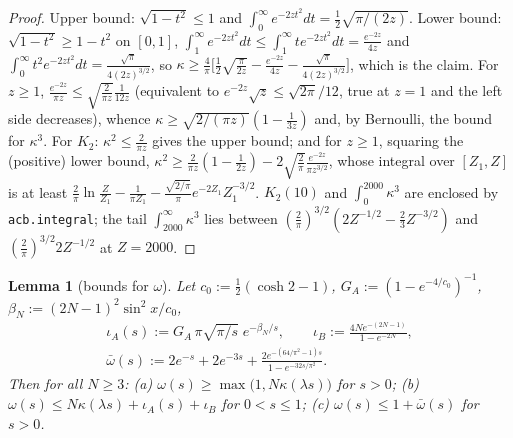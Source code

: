 \documentclass[11pt,a4paper]{article}
\newtheorem{lemma}[theorem]{Lemma}
\theoremstyle{definition}
\theoremstyle{remark}
\begin{document}
\begin{proof}
Upper bound: $\sqrt{1-t^2}\le1$ and $\int_0^\infty e^{-2zt^2}dt=\frac12\sqrt{\pi/(2z)}$. Lower bound: $\sqrt{1-t^2}\ge1-t^2$ on $[0,1]$, $\int_1^\infty e^{-2zt^2}dt\le\int_1^\infty te^{-2zt^2}dt=\frac{e^{-2z}}{4z}$ and $\int_0^\infty t^2e^{-2zt^2}dt=\frac{\sqrt\pi}{4(2z)^{3/2}}$, so $\kappa\ge\frac4\pi\bigl[\frac12\sqrt{\frac{\pi}{2z}}-\frac{e^{-2z}}{4z}-\frac{\sqrt\pi}{4(2z)^{3/2}}\bigr]$, which is the claim. For $z\ge1$, $\frac{e^{-2z}}{\pi z}\le\sqrt{\frac2{\pi z}}\frac1{12z}$ (equivalent to $e^{-2z}\sqrt z\le\sqrt{2\pi}/12$, true at $z=1$ and the left side decreases), whence $\kappa\ge\sqrt{2/(\pi z)}(1-\frac1{3z})$ and, by Bernoulli, the bound for $\kappa^3$. For $K_2$: $\kappa^2\le\frac{2}{\pi z}$ gives the upper bound; and for $z\ge1$, squaring the (positive) lower bound, $\kappa^2\ge\frac{2}{\pi z}(1-\frac1{2z})-2\sqrt{\frac2\pi}\frac{e^{-2z}}{\pi z^{3/2}}$, whose integral over $[Z_1,Z]$ is at least $\frac2\pi\ln\frac Z{Z_1}-\frac1{\pi Z_1}-\frac{\sqrt{2/\pi}}{\pi}e^{-2Z_1}Z_1^{-3/2}$. $K_2(10)$ and $\int_0^{2000}\kappa^3$ are enclosed by \texttt{acb.integral}; the tail $\int_{2000}^\infty\kappa^3$ lies between $(\frac2\pi)^{3/2}(2Z^{-1/2}-\frac23Z^{-3/2})$ and $(\frac2\pi)^{3/2}2Z^{-1/2}$ at $Z=2000$.
\end{proof}

\begin{lemma}[{bounds for $\omega$}]
Let $c_0:=\frac12(\cosh2-1)$, $G_A:=(1-e^{-4/c_0})^{-1}$, $\beta_N:=(2N-1)^2\sin^2x/c_0$,
\begin{gather*}
\iota_A(s):=G_A\,\pi\sqrt{\pi/s}\;e^{-\beta_N/s}, \qquad \iota_B:=\frac{4Ne^{-(2N-1)}}{1-e^{-2N}}, \\
\bar\omega(s):=2e^{-s}+2e^{-3s}+\frac{2e^{-(64/\pi^2-1)s}}{1-e^{-32s/\pi^2}} .
\end{gather*}
Then for all $N\ge3$: (a) $\omega(s)\ge\max\bigl(1,N\kappa(\lambda s)\bigr)$ for $s>0$; (b) $\omega(s)\le N\kappa(\lambda s)+\iota_A(s)+\iota_B$ for $0<s\le1$; (c) $\omega(s)\le1+\bar\omega(s)$ for $s>0$.
\end{lemma}
\end{document}

